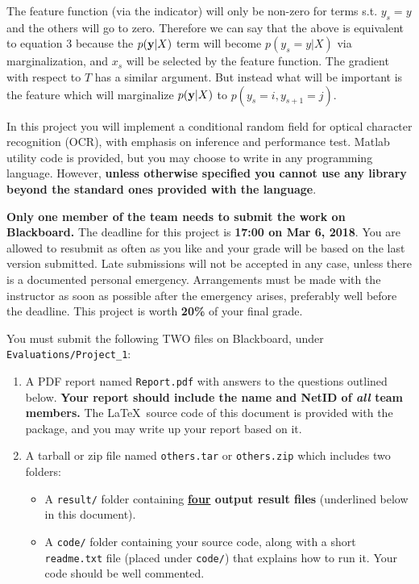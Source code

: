 \documentclass[11pt]{report}
\begin{document}
The feature function (via the indicator) will only be non-zero for terms s.t. $y_s=y$ and the others will go to zero. Therefore we can say that the above is equivalent to equation 3 because the $p(\mathbf{\boldsymbol{y}}|X)$ term will become $p(y_s=y|X)$ via marginalization, and $x_s$ will be selected by the feature function. The gradient with respect to $T$ has a similar argument. But instead what will be important is the feature  which will marginalize $p(\mathbf{\boldsymbol{y}}|X)$ to $p(y_s=i,y_{s+1}=j)$. 


















	In this project you will implement a conditional random field for optical character recognition (OCR),
	with emphasis on inference and performance test.
	Matlab utility code is provided, but you may choose to write in any programming
	language.
	However, {\bf unless otherwise specified you cannot use any library beyond the standard ones provided with the language}.
	
	{\bf Only one member of the team needs to submit the work on Blackboard.}
	The deadline for this project is {\bf 17:00 on Mar 6, 2018}.
	You are allowed to resubmit as often
	as you like and your grade will be based on the last version submitted.
	Late submissions will not be accepted in any case, unless there is a documented personal emergency.  Arrangements must be made with the instructor as soon as possible after the emergency arises,
	preferably well before the deadline.
	This project is worth {\bf 20\%} of your final grade.
	
	You must submit the following TWO files on Blackboard, under \verb#Evaluations/Project_1#:
	\vspace{-1em}
	\begin{enumerate}
		\item  A PDF report named \verb#Report.pdf# with answers to the questions outlined below.
		{\bf Your report should include the name and NetID of \emph{all} team members.}
		The \LaTeX\ source code of this document is provided with the package, and you may write up your report based on it.
		\item A tarball or zip file named \verb#others.tar# or \verb#others.zip# which includes two folders: 
		\begin{itemize}[leftmargin=*]
			\item A \verb#result/# folder containing {\bf \underline{four} output result files} (underlined below in this document).
			\item A \verb#code/# folder containing your source code, along with a short \verb#readme.txt# file (placed under \verb#code/#) that explains how to run it.
			Your code should be well commented.
		\end{itemize}
	\end{enumerate}
	\vspace{-1em}
	
\end{document}
